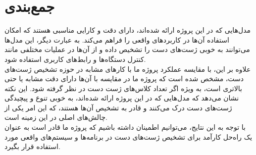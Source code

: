 \section{جمع‌بندی}
مدل‌هایی که در این پروژه ارائه شده‌اند، دارای دقت و کارایی مناسبی هستند که امکان استفاده آن‌ها در کاربردهای واقعی را فراهم می‌کند. به عبارت دیگر، این مدل‌ها می‌توانند به خوبی ژست‌های دست را تشخیص داده و از آن‌ها در عملیات مختلفی مانند کنترل دستگاه‌ها و رابط‌های کاربری استفاده شود.
\\
علاوه بر این، با مقایسه عملکرد پروژه ما با کارهای مشابه در حوزه تشخیص ژست‌های دست، مشخص شده است که پروژه ما در مقایسه با آن‌ها دارای دقت مشابه یا حتی بالاتری است، به ویژه اگر تعداد کلاس‌های ژست دست در نظر گرفته 
شود. این نکته نشان می‌دهد که مدل‌هایی که در این پروژه ارائه شده‌اند، به خوبی تنوع و پیچیدگی ژست‌های دست درک می‌کنند و قادر به تشخیص آن‌ها هستند، که این امر یکی از چالش‌های اصلی در این زمینه است.
\\
با توجه به این نتایج، می‌توانیم اطمینان داشته باشیم که پروژه ما قادر است به عنوان یک راه‌حل کارآمد برای تشخیص ژست‌های دست در برنامه‌ها و سیستم‌های واقعی مورد استفاده قرار بگیرد.
